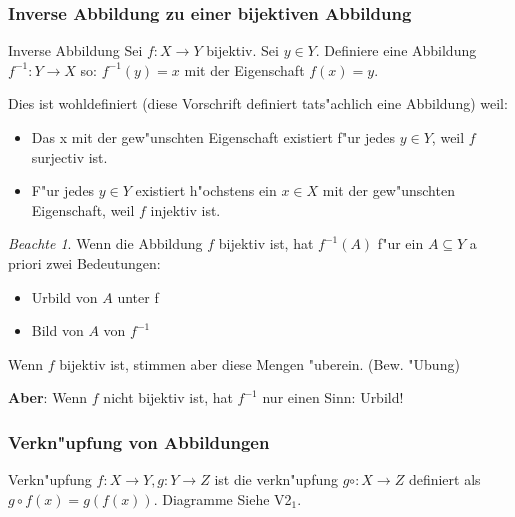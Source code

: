\documentclass[11pt]{article}
\theoremstyle{remark}
\newtheorem*{notte}{Beachte}
\theoremstyle{definition}
\theoremstyle{remark}
\begin{document}
\subsubsection{Inverse Abbildung zu einer bijektiven Abbildung}
\label{sec:orgaae7124}
\begin{definition}{Inverse Abbildung}{}
Sei \(f:X\to Y\) bijektiv. Sei \(y\in Y\). Definiere eine Abbildung \(f^{-1}:
Y\to X\) so: \(f^{-1}(y)=x\) mit der Eigenschaft \(f(x)=y\).
\end{definition}

Dies ist wohldefiniert (diese Vorschrift definiert tats"achlich eine Abbildung)
weil:

\begin{relation}
\begin{itemize}
\item Das x mit der gew"unschten Eigenschaft existiert f"ur jedes \(y\in Y\), weil
\(f\) surjectiv ist.
\item F"ur jedes \(y\in Y\) existiert h"ochstens ein \(x\in X\) mit der gew"unschten
Eigenschaft, weil \(f\) injektiv ist.
\end{itemize}
\end{relation}

\begin{notte}
Wenn die Abbildung \(f\) bijektiv ist, hat \(f^{-1}(A)\) f"ur ein \(A\subseteq Y\) a
priori zwei Bedeutungen:
\begin{itemize}
\item Urbild von \(A\) unter f
\item Bild von \(A\) von \(f^{-1}\)
\end{itemize}

Wenn \(f\) bijektiv ist, stimmen aber diese Mengen "uberein. (Bew. "Ubung)

\textbf{Aber}: Wenn \(f\) nicht bijektiv ist, hat \(f^{-1}\) nur einen Sinn: Urbild!
\end{notte}

\subsubsection{Verkn"upfung von Abbildungen}
\label{sec:org540b965}
\begin{definition}{Verkn"upfung}{}
\(f: X\to Y, g: Y\to Z\) ist die verkn"upfung \(g\circ: X\to Z\) definiert
als \(g\circ f(x)=g(f(x))\). Diagramme Siehe V2\(_{\text{1}}\).
\end{definition}
\end{document}
